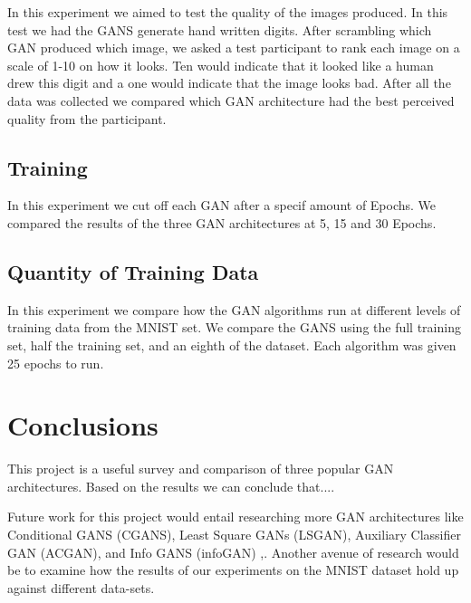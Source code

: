 \documentclass[12pt,
 reprint,
 amsmath,amssymb,
 aps,
]{revtex4-2}
\begin{document}
In this experiment we aimed to test the quality of the images produced. In this test we had the GANS generate hand written digits. After scrambling which GAN produced which image, we asked a test participant to rank each image on a scale of 1-10 on how it looks. Ten would indicate that it looked like a human drew this digit and a one would indicate that the image looks bad. After all the data was collected we compared which GAN architecture had the best perceived quality from the participant. 


\subsection{\label{sec:expTime}Training}

In this experiment we cut off each GAN after a specif amount of Epochs. We compared the results of the three GAN architectures at 5, 15 and 30 Epochs.  


\subsection{\label{sec:expData}Quantity of Training Data}

In this experiment we compare how the GAN algorithms run at different levels of training data from the MNIST set. We compare the GANS using the full training set, half the training set, and an eighth of the dataset. Each algorithm was given 25 epochs to run. 






\section{\label{sec:exp}Conclusions}

This project is a useful survey and comparison of three popular GAN architectures. Based on the results we can conclude that....

Future work for this project would entail researching more GAN architectures like Conditional GANS (CGANS), Least Square GANs (LSGAN), Auxiliary Classifier GAN (ACGAN), and Info GANS (infoGAN) \cite{cGAN, lsgan, acgan, infogan},. Another avenue of research would be to examine how the results of our experiments on the MNIST dataset hold up against different data-sets. 
\end{document}

